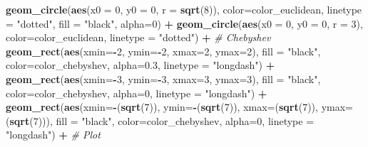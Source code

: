 \documentclass[]{article}
\newenvironment{Shaded}{\begin{snugshade}}{\end{snugshade}}
\newcommand{\CommentTok}[1]{\textcolor[rgb]{0.56,0.35,0.01}{\textit{#1}}}
\newcommand{\DataTypeTok}[1]{\textcolor[rgb]{0.13,0.29,0.53}{#1}}
\newcommand{\DecValTok}[1]{\textcolor[rgb]{0.00,0.00,0.81}{#1}}
\newcommand{\FloatTok}[1]{\textcolor[rgb]{0.00,0.00,0.81}{#1}}
\newcommand{\KeywordTok}[1]{\textcolor[rgb]{0.13,0.29,0.53}{\textbf{#1}}}
\newcommand{\NormalTok}[1]{#1}
\newcommand{\OperatorTok}[1]{\textcolor[rgb]{0.81,0.36,0.00}{\textbf{#1}}}
\newcommand{\StringTok}[1]{\textcolor[rgb]{0.31,0.60,0.02}{#1}}
\begin{document}
\begin{Shaded}
\begin{Highlighting}[]
\StringTok{  }\KeywordTok{geom_circle}\NormalTok{(}\KeywordTok{aes}\NormalTok{(}\DataTypeTok{x0 =} \DecValTok{0}\NormalTok{, }\DataTypeTok{y0 =} \DecValTok{0}\NormalTok{, }\DataTypeTok{r =} \KeywordTok{sqrt}\NormalTok{(}\DecValTok{8}\NormalTok{)),  }\DataTypeTok{color=}\NormalTok{color_euclidean, }\DataTypeTok{linetype =} \StringTok{"dotted"}\NormalTok{, }\DataTypeTok{fill =} \StringTok{"black"}\NormalTok{, }\DataTypeTok{alpha=}\DecValTok{0}\NormalTok{) }\OperatorTok{+}
\StringTok{  }\KeywordTok{geom_circle}\NormalTok{(}\KeywordTok{aes}\NormalTok{(}\DataTypeTok{x0 =} \DecValTok{0}\NormalTok{, }\DataTypeTok{y0 =} \DecValTok{0}\NormalTok{, }\DataTypeTok{r =} \DecValTok{3}\NormalTok{),  }\DataTypeTok{color=}\NormalTok{color_euclidean, }\DataTypeTok{linetype =} \StringTok{"dotted"}\NormalTok{) }\OperatorTok{+}
\StringTok{  }\CommentTok{# Chebyshev}
\StringTok{  }\KeywordTok{geom_rect}\NormalTok{(}\KeywordTok{aes}\NormalTok{(}\DataTypeTok{xmin=}\OperatorTok{-}\DecValTok{2}\NormalTok{, }\DataTypeTok{ymin=}\OperatorTok{-}\DecValTok{2}\NormalTok{, }\DataTypeTok{xmax=}\DecValTok{2}\NormalTok{, }\DataTypeTok{ymax=}\DecValTok{2}\NormalTok{), }\DataTypeTok{fill =} \StringTok{"black"}\NormalTok{, }\DataTypeTok{color=}\NormalTok{color_chebyshev, }\DataTypeTok{alpha=}\FloatTok{0.3}\NormalTok{, }\DataTypeTok{linetype =} \StringTok{"longdash"}\NormalTok{) }\OperatorTok{+}
\StringTok{  }\KeywordTok{geom_rect}\NormalTok{(}\KeywordTok{aes}\NormalTok{(}\DataTypeTok{xmin=}\OperatorTok{-}\DecValTok{3}\NormalTok{, }\DataTypeTok{ymin=}\OperatorTok{-}\DecValTok{3}\NormalTok{, }\DataTypeTok{xmax=}\DecValTok{3}\NormalTok{, }\DataTypeTok{ymax=}\DecValTok{3}\NormalTok{), }\DataTypeTok{fill =} \StringTok{"black"}\NormalTok{, }\DataTypeTok{color=}\NormalTok{color_chebyshev, }\DataTypeTok{alpha=}\DecValTok{0}\NormalTok{, }\DataTypeTok{linetype =} \StringTok{"longdash"}\NormalTok{) }\OperatorTok{+}
\StringTok{  }\KeywordTok{geom_rect}\NormalTok{(}\KeywordTok{aes}\NormalTok{(}\DataTypeTok{xmin=}\OperatorTok{-}\NormalTok{(}\KeywordTok{sqrt}\NormalTok{(}\DecValTok{7}\NormalTok{)), }\DataTypeTok{ymin=}\OperatorTok{-}\NormalTok{(}\KeywordTok{sqrt}\NormalTok{(}\DecValTok{7}\NormalTok{)), }\DataTypeTok{xmax=}\NormalTok{(}\KeywordTok{sqrt}\NormalTok{(}\DecValTok{7}\NormalTok{)), }\DataTypeTok{ymax=}\NormalTok{(}\KeywordTok{sqrt}\NormalTok{(}\DecValTok{7}\NormalTok{))), }\DataTypeTok{fill =} \StringTok{"black"}\NormalTok{, }\DataTypeTok{color=}\NormalTok{color_chebyshev, }\DataTypeTok{alpha=}\DecValTok{0}\NormalTok{, }\DataTypeTok{linetype =} \StringTok{"longdash"}\NormalTok{) }\OperatorTok{+}
\StringTok{  }\CommentTok{# Plot}

\end{Highlighting}
\end{Shaded}
\end{document}
